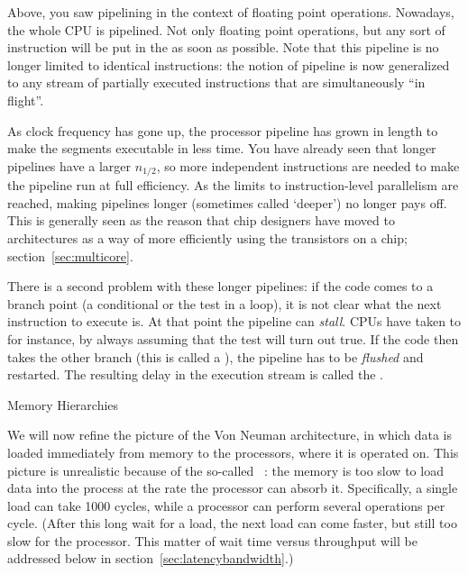 Above, you saw pipelining in the context of floating point
operations. Nowadays, the whole CPU is pipelined. Not only floating point
operations, but any sort of instruction will be put in the
 as soon
as possible. Note that this pipeline is no longer limited to identical
instructions: the notion of pipeline is now generalized to any stream
of partially executed instructions that are simultaneously ``in
flight''.

As clock frequency has gone up, the processor pipeline has grown in
length to make the segments executable in less time. You have already
seen that longer pipelines have a larger $n_{1/2}$, so more
independent instructions are needed to make the pipeline run at full
efficiency. As the limits to instruction-level parallelism are
reached, making pipelines longer (sometimes
called `deeper') no longer pays off. This is
generally seen as the reason that chip designers have moved to
 architectures as a way of more efficiently
using the transistors on a chip; section~\ref{sec:multicore}.

There is a second problem with these longer pipelines: if the code
comes to a branch point (a conditional or the test in a loop), it is
not clear what the next instruction to execute is. At that point the
pipeline can \emph{stall}. CPUs have taken to
 for instance, by always assuming
that the test will turn out true. If the code then takes the other
branch (this is called a ), the
pipeline has to be \emph{flushed} and
restarted. The resulting delay in the execution stream is called the
.

 {Memory Hierarchies}
\label{sec:hierarchy}

We will now refine the picture of the Von Neuman architecture, in
which data is loaded immediately from memory to the processors, where
it is operated on. This picture is unrealistic because of the
so-called ~\cite{Wulf:memory-wall}: the
memory is too slow to load data into the process at the rate the
processor can absorb it. Specifically, a single load can take 1000
cycles, while a processor can perform several operations per
cycle. (After this long wait for a load, the next load can come
faster, but still too slow for the processor. This matter of wait time
versus throughput will be addressed below in
section~\ref{sec:latencybandwidth}.)

